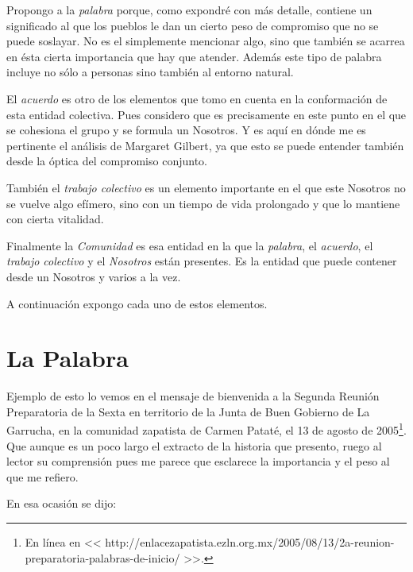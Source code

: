 \documentclass[oneside]{book}
\begin{document}
Propongo a la \textit{palabra} porque, como expondré con más detalle, contiene un significado al que los pueblos le dan un cierto peso de compromiso que no se puede soslayar. No es el simplemente mencionar algo, sino que también se acarrea en ésta cierta importancia que hay que atender. Además este tipo de palabra incluye no sólo a personas sino también al entorno natural.

El \textit{acuerdo} es otro de los elementos que tomo en cuenta en la conformación de esta entidad colectiva. Pues considero que es precisamente en este punto en el que se cohesiona el grupo y se formula un Nosotros. Y es aquí en dónde me es pertinente el análisis de Margaret Gilbert, ya que esto se puede entender también desde la óptica del compromiso conjunto.    

También el \textit{trabajo colectivo} es un elemento importante en el que este Nosotros no se vuelve algo efímero, sino con un tiempo de vida prolongado y que lo mantiene con cierta vitalidad.

Finalmente la \textit{Comunidad} es esa entidad en la que la \textit{palabra}, el \textit{acuerdo}, el \textit{trabajo colectivo} y el \textit{Nosotros} están presentes. Es la entidad que puede contener desde un Nosotros y varios a la vez.

A continuación expongo cada uno de estos elementos. 

\section{La Palabra}

Ejemplo de esto lo vemos en el mensaje de bienvenida a la Segunda Reunión Preparatoria de la Sexta en territorio de la Junta de Buen Gobierno de La Garrucha, en la comunidad zapatista de Carmen Pataté, el 13 de agosto de 2005\footnote{En línea en << http://enlacezapatista.ezln.org.mx/2005/08/13/2a-reunion-preparatoria-palabras-de-inicio/ >>.}. Que aunque es un poco largo el extracto de la historia que presento, ruego al lector su comprensión pues me parece que esclarece la importancia y el peso al que me refiero. 

En esa ocasión se dijo:
\end{document}

